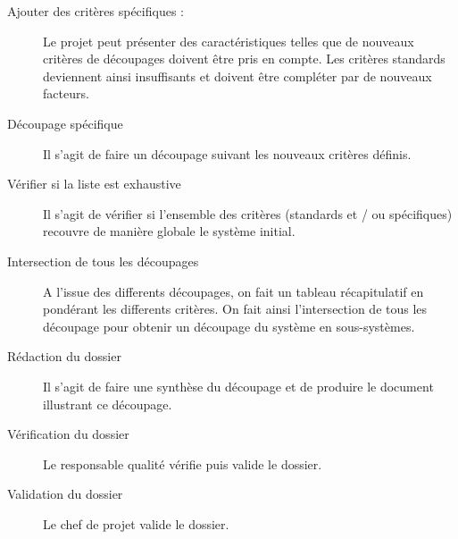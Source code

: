 \begin{description}
\begin{itemize}
\end{itemize}
\item[Ajouter des critères spécifiques :]
Le projet peut présenter des caractéristiques telles que de nouveaux critères de découpages doivent être pris en compte. Les critères standards deviennent
ainsi insuffisants et doivent être compléter par de nouveaux facteurs.
\item[Découpage spécifique]
Il s'agit de faire un découpage suivant les nouveaux critères définis.
\item[Vérifier si la liste est exhaustive]
Il s'agit de vérifier si l'ensemble des critères (standards et / ou spécifiques) recouvre de manière globale le système initial.
\item[Intersection de tous les découpages]
A l'issue des differents découpages, on fait un tableau récapitulatif en pondérant les differents critères. On fait ainsi l'intersection de tous les découpage
pour obtenir un découpage du système en sous-systèmes.
\item[Rédaction du dossier]
Il s'agit de faire une synthèse du découpage et de produire le document illustrant ce découpage.
\item[Vérification du dossier]
Le responsable qualité vérifie puis valide le dossier.
\item[Validation du dossier]
Le chef de projet valide le dossier.
\end{description}
	   


 
